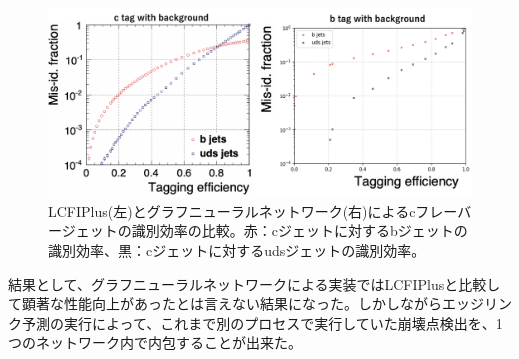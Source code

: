 \begin{figure}[H]
	\begin{center}
 \includegraphics[keepaspectratio, scale=0.3]
 	{Figure/Flavortagging/gnneff_c.png}
 		\caption{LCFIPlus(左)とグラフニューラルネットワーク(右)によるcフレーバージェットの識別効率の比較。赤：cジェットに対するbジェットの識別効率、黒：cジェットに対するudsジェットの識別効率。}
 		\label{gnneff_c}
	\end{center}
\end{figure}
結果として、グラフニューラルネットワークによる実装ではLCFIPlusと比較して顕著な性能向上があったとは言えない結果になった。しかしながらエッジリンク予測の実行によって、これまで別のプロセスで実行していた崩壊点検出を、1つのネットワーク内で内包することが出来た。